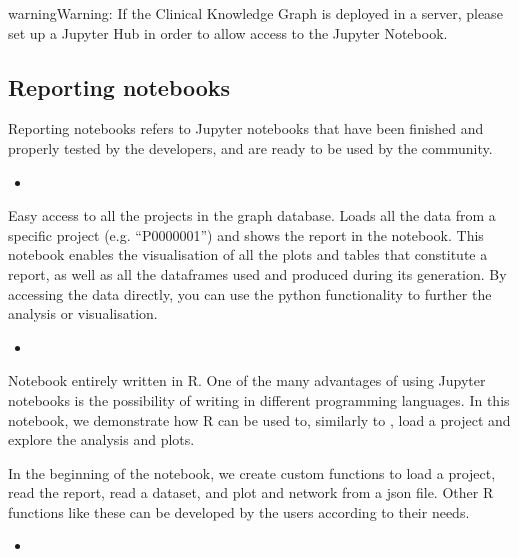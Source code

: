 \documentclass[letterpaper,10pt,english]{sphinxmanual}
\begin{document}
\begin{sphinxadmonition}{warning}{Warning:}
If the Clinical Knowledge Graph is deployed in a server, please set up a Jupyter Hub in order to allow access to the Jupyter Notebook.
\end{sphinxadmonition}


\subsection{Reporting notebooks}
\label{\detokenize{advanced_features/ckg-notebooks:reporting-notebooks}}
Reporting notebooks refers to Jupyter notebooks that have been finished and properly tested by the developers, and are ready to be used by the community.
\begin{itemize}
\item {} 

\end{itemize}

Easy access to all the projects in the graph database. Loads all the data from a specific project (e.g. “P0000001”) and shows the report in the notebook.
This notebook enables the visualisation of all the plots and tables that constitute a report, as well as all the dataframes used and produced during its generation.
By accessing the data directly, you can use the python functionality to further the analysis or visualisation.
\begin{itemize}
\item {} 

\end{itemize}

Notebook entirely written in R. One of the many advantages of using Jupyter notebooks is the possibility of writing in different programming languages.
In this notebook, we demonstrate how R can be used to, similarly to , load a project and explore the analysis and plots.

In the beginning of the notebook, we create custom functions to load a project, read the report, read a dataset, and plot and network from a json file.
Other R functions like these can be developed by the users according to their needs.
\begin{itemize}
\item {} 

\end{itemize}
\end{document}
